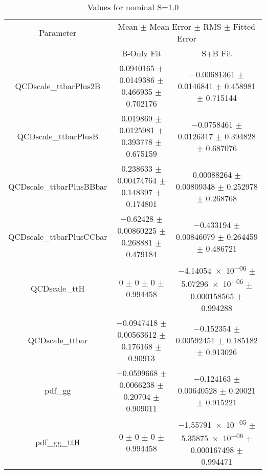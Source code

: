 \begin{table}
\centering
\caption{Values for nominal S=1.0}
\begin{tabular}{ccc}
\toprule
Parameter & \multicolumn{2}{c}{Mean $\pm$ Mean Error $\pm$ RMS $\pm$ Fitted Error}\\
 & B-Only Fit & S+B Fit\\
\midrule
QCDscale\_ttbarPlus2B & \num{0.0940165} $\pm$ \num{0.0149386} $\pm$ \num{0.466935} $\pm$ \num{0.702176} & \num{-0.00681361} $\pm$ \num{0.0146841} $\pm$ \num{0.458981} $\pm$ \num{0.715144}\\
QCDscale\_ttbarPlusB & \num{0.019869} $\pm$ \num{0.0125981} $\pm$ \num{0.393778} $\pm$ \num{0.675159} & \num{-0.0758461} $\pm$ \num{0.0126317} $\pm$ \num{0.394828} $\pm$ \num{0.687076}\\
QCDscale\_ttbarPlusBBbar & \num{0.238633} $\pm$ \num{0.00474764} $\pm$ \num{0.148397} $\pm$ \num{0.174801} & \num{0.00088264} $\pm$ \num{0.00809348} $\pm$ \num{0.252978} $\pm$ \num{0.268768}\\
QCDscale\_ttbarPlusCCbar & \num{-0.62428} $\pm$ \num{0.00860225} $\pm$ \num{0.268881} $\pm$ \num{0.479184} & \num{-0.433194} $\pm$ \num{0.00846079} $\pm$ \num{0.264459} $\pm$ \num{0.486721}\\
QCDscale\_ttH & \num{0} $\pm$ \num{0} $\pm$ \num{0} $\pm$ \num{0.994458} & \num{-4.14054e-06} $\pm$ \num{5.07296e-06} $\pm$ \num{0.000158565} $\pm$ \num{0.994288}\\
QCDscale\_ttbar & \num{-0.0947418} $\pm$ \num{0.00563612} $\pm$ \num{0.176168} $\pm$ \num{0.90913} & \num{-0.152354} $\pm$ \num{0.00592451} $\pm$ \num{0.185182} $\pm$ \num{0.913026}\\
pdf\_gg & \num{-0.0599668} $\pm$ \num{0.0066238} $\pm$ \num{0.20704} $\pm$ \num{0.909011} & \num{-0.124163} $\pm$ \num{0.00640528} $\pm$ \num{0.20021} $\pm$ \num{0.915221}\\
pdf\_gg\_ttH & \num{0} $\pm$ \num{0} $\pm$ \num{0} $\pm$ \num{0.994458} & \num{-1.55791e-05} $\pm$ \num{5.35875e-06} $\pm$ \num{0.000167498} $\pm$ \num{0.994471}\\
\bottomrule
\end{tabular}
\end{table}